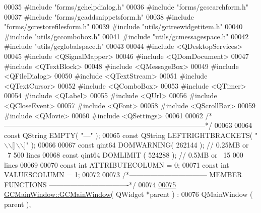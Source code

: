 \begin{DoxyCode}
00035 \textcolor{preprocessor}{#include "forms/gchelpdialog.h"}
00036 \textcolor{preprocessor}{#include "forms/gcsearchform.h"}
00037 \textcolor{preprocessor}{#include "forms/gcaddsnippetsform.h"}
00038 \textcolor{preprocessor}{#include "forms/gcrestorefilesform.h"}
00039 \textcolor{preprocessor}{#include "utils/gctreewidgetitem.h"}
00040 \textcolor{preprocessor}{#include "utils/gccombobox.h"}
00041 \textcolor{preprocessor}{#include "utils/gcmessagespace.h"}
00042 \textcolor{preprocessor}{#include "utils/gcglobalspace.h"}
00043 
00044 \textcolor{preprocessor}{#include <QDesktopServices>}
00045 \textcolor{preprocessor}{#include <QSignalMapper>}
00046 \textcolor{preprocessor}{#include <QDomDocument>}
00047 \textcolor{preprocessor}{#include <QTextBlock>}
00048 \textcolor{preprocessor}{#include <QMessageBox>}
00049 \textcolor{preprocessor}{#include <QFileDialog>}
00050 \textcolor{preprocessor}{#include <QTextStream>}
00051 \textcolor{preprocessor}{#include <QTextCursor>}
00052 \textcolor{preprocessor}{#include <QComboBox>}
00053 \textcolor{preprocessor}{#include <QTimer>}
00054 \textcolor{preprocessor}{#include <QLabel>}
00055 \textcolor{preprocessor}{#include <QUrl>}
00056 \textcolor{preprocessor}{#include <QCloseEvent>}
00057 \textcolor{preprocessor}{#include <QFont>}
00058 \textcolor{preprocessor}{#include <QScrollBar>}
00059 \textcolor{preprocessor}{#include <QMovie>}
00060 \textcolor{preprocessor}{#include <QSettings>}
00061 
00062 \textcolor{comment}{/*
      --------------------------------------------------------------------------------------*/}
00063 
00064 \textcolor{keyword}{const} QString EMPTY( \textcolor{stringliteral}{"---"} );
00065 \textcolor{keyword}{const} QString LEFTRIGHTBRACKETS( \textcolor{stringliteral}{"\(\backslash\)\(\backslash\)[|\(\backslash\)\(\backslash\)]"} );
00066 
00067 \textcolor{keyword}{const} qint64  DOMWARNING( 262144 );  \textcolor{comment}{// 0.25MB or ~7 500 lines}
00068 \textcolor{keyword}{const} qint64  DOMLIMIT  ( 524288 );  \textcolor{comment}{// 0.5MB  or ~15 000 lines}
00069 
00070 \textcolor{keyword}{const} \textcolor{keywordtype}{int} ATTRIBUTECOLUMN = 0;
00071 \textcolor{keyword}{const} \textcolor{keywordtype}{int} VALUESCOLUMN    = 1;
00072 
00073 \textcolor{comment}{/*--------------------------------- MEMBER FUNCTIONS
       ----------------------------------*/}
00074 
\hypertarget{gcmainwindow_8cpp_source_l00075}{}\hyperlink{class_g_c_main_window_ab20de5f22439fbb8baf7d6b4be2ef63e}{00075} \hyperlink{class_g_c_main_window_ab20de5f22439fbb8baf7d6b4be2ef63e}{GCMainWindow::GCMainWindow}( QWidget *parent ) :
00076   QMainWindow               ( parent ),

\end{DoxyCode}
